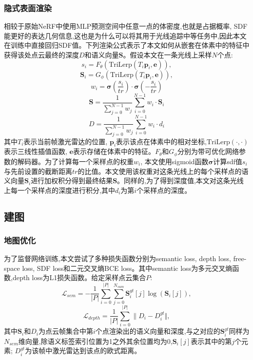 \subsubsection{隐式表面渲染}
相较于原始NeRF中使用MLP预测空间中任意一点的体密度,也就是占据概率, SDF能更好的表达几何信息,这也是为什么可以将其用于光线追踪中等任务中,因此本文在训练中直接回归SDF值。下列渲染公式表示了本文如何从嵌套在体素中的特征中获得该处点云最终的深度$D$和语义向量$\mathbf{S}$。假设本文在一条光线上采样$N$个点:
\begin{equation}
    s_i=F_\theta(\mbox{TriLerp}(T_i\mathbf{p}_i,\mathbf{e})),
\end{equation}
\begin{equation}
    \mathbf{S}_i=G_\phi(\mbox{TriLerp}(T_i\mathbf{p}_i,\mathbf{e})),
\end{equation}
\begin{equation}
    w_i=\mathbf{\sigma}(\frac{s_i}{tr})\cdot\mathbf{\sigma}(-\frac{s_i}{tr})
\end{equation}
\begin{equation}
    \mathbf{S} = \frac{1}{\sum_{j=0}^{N-1}w_j}\sum_{i=0}^{N-1}w_i\cdot\mathbf{S}_i
\end{equation}
\begin{equation}
    D = \frac{1}{\sum_{j=0}^{N-1}w_j}\sum_{i=0}^{N-1}w_i\cdot d_i
\end{equation}
其中$T_i$表示当前帧激光雷达的位置, $\mathbf{p}_i$表示该点在体素中的相对坐标,$\mbox{TriLerp}(\cdot , \cdot)$表示三线性插值函数, $\mathbf{e}$表示存储在体素中的特征。$F_\theta\mbox{和}G_\phi$分别为带可优化网络参数的解码器。为了计算每一个采样点的权重$w_i$, 本文使用sigmoid函数$\mathbf{\sigma}$计算sdf值$s_i$与先前设置的截断距离$tr$的比值。本文使用该权重对这条光线上的每个采样点的语义向量$\mathbf{S}_i$进行加权积分得到最终结果$\mathbf{S}$。同样的,为了得到深度值,本文对这条光线上每一个采样点的深度进行积分,其中$d_i$为第$i$个采样点的深度。
\subsection{建图}
\subsubsection{地图优化}
为了监督网络训练,本文尝试了多种损失函数分别为semantic loss, depth loss, free-space loss, SDF loss和二元交叉熵BCE loss。其中semantic loss为多元交叉熵函数,depth loss为L1损失函数。给定采样点云集合$P$:
\begin{equation}
    \mathcal{L}_{sem} = -\frac{1}{|P|}\sum_{i=0}^{|P|}\sum_{j=0}^{N_{sum}}\mathbf{S}_i^{gt}[j]\log(\mathbf{S}_i[j]),
\end{equation}
\begin{equation}
    \mathcal{L}_{depth} = \frac{1}{|P|}\sum_{i=0}^{|P|}\| D_i-D_i^{gt}\Vert ,
\end{equation}
其中$\mathbf{S}_i$和$D_i$为点云帧集合中第$i$个点渲染出的语义向量和深度,与之对应的$\mathbf{S}_i^{gt}$同样为$N_{sem}$维向量,除语义标签索引位置为1之外其余位置均为0,$\mathbf{S}_i[j]$表示其中的第$j$个元素; $D_i^{gt}$为该帧中激光雷达到该点的欧式距离。 

